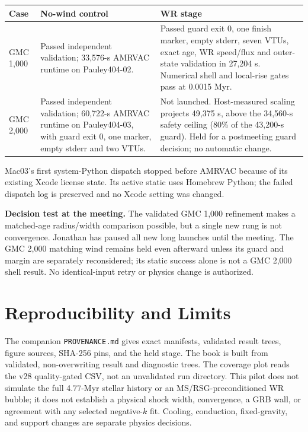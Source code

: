 \documentclass[10pt,letterpaper]{article}
\begin{document}
\begingroup\small\renewcommand{\arraystretch}{1.08}
\begin{tabularx}{\textwidth}{@{}>{\raggedright\arraybackslash}p{}>{\raggedright\arraybackslash}p{}>{\raggedright\arraybackslash}X@{}}
\toprule
Case & No-wind control & WR stage \\
\midrule
GMC 1,000 & Passed independent validation; 33,576-s AMRVAC runtime on Pauley404-02. & Passed guard exit 0, one finish marker, empty stderr, seven VTUs, exact age, WR speed/flux and outer-state validation in 27,204 s. Numerical shell and local-rise gates pass at 0.0015 Myr. \\
GMC 2,000 & Passed independent validation; 60,722-s AMRVAC runtime on Pauley404-03, with guard exit 0, one marker, empty stderr and two VTUs. & Not launched. Host-measured scaling projects 49,375 s, above the 34,560-s safety ceiling (80\% of the 43,200-s guard). Held for a postmeeting guard decision; no automatic change. \\
\bottomrule
\end{tabularx}
\endgroup

Mac03's first system-Python dispatch stopped before AMRVAC because of its existing Xcode license state. Its active static uses Homebrew Python; the failed dispatch log is preserved and no Xcode setting was changed.

\textbf{Decision test at the meeting.} The validated GMC 1,000 refinement makes a matched-age radius/width comparison possible, but a single new rung is not convergence. Jonathan has paused all new long launches until the meeting. The GMC 2,000 matching wind remains held even afterward unless its guard and margin are separately reconsidered; its static success alone is not a GMC 2,000 shell result. No identical-input retry or physics change is authorized.

\section{Reproducibility and Limits}
The companion \texttt{PROVENANCE.md} gives exact manifests, validated result trees, figure sources, SHA-256 pins, and the held stage. The book is built from validated, non-overwriting result and diagnostic trees. The coverage plot reads the v28 quality-gated CSV, not an unvalidated run directory. This pilot does not simulate the full 4.77-Myr stellar history or an MS/RSG-preconditioned WR bubble; it does not establish a physical shock width, convergence, a GRB wall, or agreement with any selected negative-$k$ fit. Cooling, conduction, fixed-gravity, and support changes are separate physics decisions.
\end{document}
